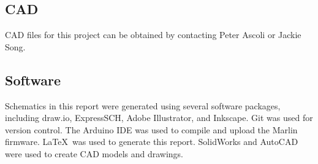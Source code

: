 \subsection{CAD}
CAD files for this project can be obtained by contacting Peter Ascoli or Jackie Song.

\subsection{Software}
Schematics in this report were generated using several software packages, including draw.io, ExpressSCH, Adobe Illustrator, and Inkscape. Git was used for version control. The Arduino IDE was used to compile and upload the Marlin firmware. \LaTeX\ was used to generate this report. SolidWorks and AutoCAD were used to create CAD models and drawings. 
